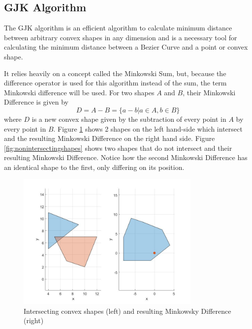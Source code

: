 \subsection{GJK Algorithm}
\label{sec:gjkalg}

\par The \ac{GJK} algorithm is an efficient algorithm to calculate minimum distance between arbitrary convex shapes in any dimension and is a necessary tool for calculating the minimum distance between a Bezier Curve and a point or convex shape.
\par It relies heavily on a concept called the Minkowski Sum, but, because the difference operator is used for this algorithm instead of the sum, the term Minkowski difference will be used. For two shapes $A$ and $B$, their Minkowski Difference is given by
\begin{equation}
    D = A - B = \{a-b|a\in A, b\in B\}
\end{equation}
where $D$ is a new convex shape given by the subtraction of every point in $A$ by every point in $B$.
Figure \ref{fig:intersectingshapes} shows 2 shapes on the left hand-side which intersect and the resulting Minkowski Difference on the right hand side. Figure \ref{fig:nonintersectingshapes} shows two shapes that do not intersect and their resulting Minkowski Difference. Notice how the second Minkowski Difference has an identical shape to the first, only differing on its position.
\begin{figure}
\centering
\includegraphics[width=0.8\textwidth]{Images/intersectingshapes.jpg}
\caption{Intersecting convex shapes (left) and resulting Minkowsky Difference (right)}
\label{fig:intersectingshapes}
\end{figure}
